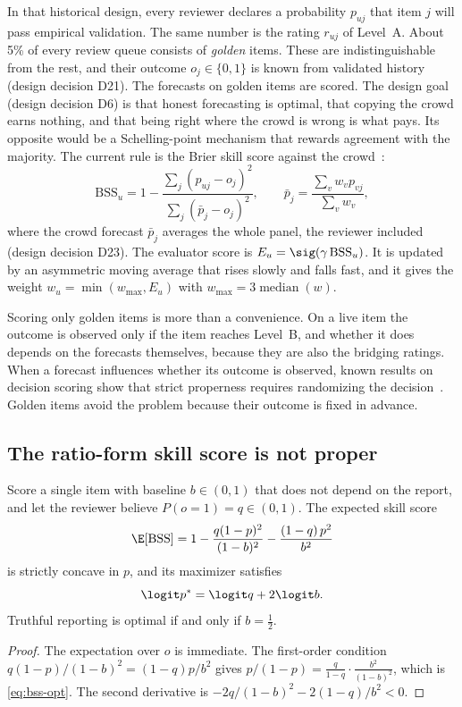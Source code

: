 In that historical design, every reviewer declares a probability $p_{uj}$ that item $j$
will pass empirical validation. The
same number is the rating $r_{uj}$ of Level~A. About 5\% of every review queue consists of
\emph{golden} items. These are indistinguishable from the rest, and their outcome
$o_j\in\{0,1\}$ is known from validated history (design decision D21). The forecasts on golden
items are scored. The design goal (design decision D6) is that honest forecasting is optimal, that
copying the crowd earns nothing, and that being right where the crowd is wrong is what pays. Its
opposite would be a Schelling-point mechanism that rewards agreement with the majority. The
current rule is the Brier skill score against the crowd~\cite{brier1950,murphy1988skill}:
\begin{equation}\label{eq:bss}
  \mathrm{BSS}_u=1-\frac{\sum_j(p_{uj}-o_j)^2}{\sum_j(\bar p_j-o_j)^2},\qquad
  \bar p_j=\frac{\sum_v w_vp_{vj}}{\sum_v w_v},
\end{equation}
where the crowd forecast $\bar p_j$ averages the whole panel, the reviewer included (design
decision D23). The evaluator score is $E_u=\sig(\gamma\,\mathrm{BSS}_u)$. It is updated by an
asymmetric moving average that rises slowly and falls fast, and it gives the weight
$w_u=\min(w_{\max},E_u)$ with $w_{\max}=3\operatorname{median}(w)$.

Scoring only golden items is more than a convenience. On a live item the outcome is observed only
if the item reaches Level~B, and whether it does depends on the forecasts themselves, because they
are also the bridging ratings. When a forecast influences whether its outcome is observed, known
results on decision scoring show that strict properness requires randomizing the
decision~\cite{othman2010decision,chen2014eliciting}.
Golden items avoid the problem because their outcome is fixed in advance.

\subsection{The ratio-form skill score is not proper}

\begin{proposition}\label{prop:bss}\proved{}
Score a single item with baseline $b\in(0,1)$ that does not depend on the report, and let the
reviewer believe $P(o=1)=q\in(0,1)$. The expected skill score
\[
  \E[\mathrm{BSS}]=1-\frac{q(1-p)^2}{(1-b)^2}-\frac{(1-q)\,p^2}{b^2}
\]
is strictly concave in $p$, and its maximizer satisfies
\begin{equation}\label{eq:bss-opt}
  \logit p^{*}=\logit q+2\logit b .
\end{equation}
Truthful reporting is optimal if and only if $b=\tfrac12$.
\end{proposition}
\begin{proof}
The expectation over $o$ is immediate. The first-order condition
$q(1-p)/(1-b)^2=(1-q)p/b^2$ gives $p/(1-p)=\frac{q}{1-q}\cdot\frac{b^2}{(1-b)^2}$, which is
\eqref{eq:bss-opt}. The second derivative is $-2q/(1-b)^2-2(1-q)/b^2<0$.
\end{proof}

